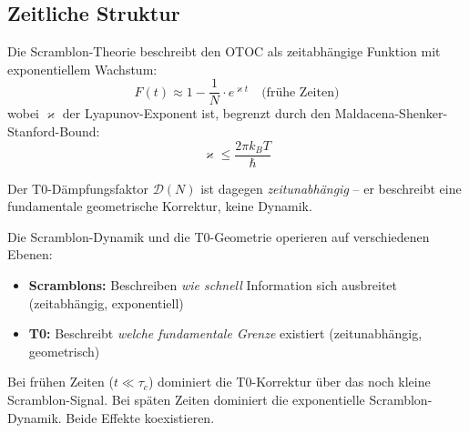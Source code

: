 \subsection{Zeitliche Struktur}

Die Scramblon-Theorie beschreibt den OTOC als zeitabhängige Funktion mit exponentiellem Wachstum:
\begin{equation}
	F(t) \approx 1 - \frac{1}{N} \cdot e^{\varkappa t} \quad \text{(frühe Zeiten)}
	\label{eq:otoc_scrambling}
\end{equation}
wobei $\varkappa$ der Lyapunov-Exponent ist, begrenzt durch den Maldacena-Shenker-Stanford-Bound:
\begin{equation}
	\varkappa \leq \frac{2\pi k_B T}{\hbar}
\end{equation}

Der T0-Dämpfungsfaktor $\mathcal{D}(N)$ ist dagegen \emph{zeitunabhängig} -- er beschreibt eine fundamentale geometrische Korrektur, keine Dynamik.

\begin{table}[h]
	\centering
	\caption{Zeitvergleich: Scramblon-OTOC-Abfall vs.\ statische T0-Korrektur ($N=16$, $\varkappa \cdot \tau_c \approx 1$)}
	\label{tab:time_comparison}
\end{table}

\begin{remark}[Komplementarität]
	Die Scramblon-Dynamik und die T0-Geometrie operieren auf verschiedenen Ebenen:
	\begin{itemize}
		\item \textbf{Scramblons:} Beschreiben \emph{wie schnell} Information sich ausbreitet (zeitabhängig, exponentiell)
		\item \textbf{T0:} Beschreibt \emph{welche fundamentale Grenze} existiert (zeitunabhängig, geometrisch)
	\end{itemize}
	Bei frühen Zeiten ($t \ll \tau_c$) dominiert die T0-Korrektur über das noch kleine Scramblon-Signal. Bei späten Zeiten dominiert die exponentielle Scramblon-Dynamik. Beide Effekte koexistieren.
\end{remark}

